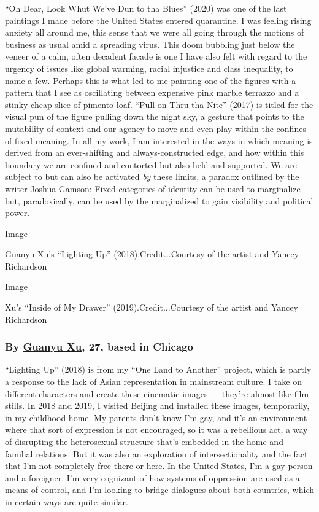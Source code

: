 ``Oh Dear, Look Whut We've Dun to tha Blues'' (2020) was one of the last
paintings I made before the United States entered quarantine. I was
feeling rising anxiety all around me, this sense that we were all going
through the motions of business as usual amid a spreading virus. This
doom bubbling just below the veneer of a calm, often decadent facade is
one I have also felt with regard to the urgency of issues like global
warming, racial injustice and class inequality, to name a few. Perhaps
this is what led to me painting one of the figures with a pattern that I
see as oscillating between expensive pink marble terrazzo and a stinky
cheap slice of pimento loaf. ``Pull on Thru tha Nite'' (2017) is titled
for the visual pun of the figure pulling down the night sky, a gesture
that points to the mutability of context and our agency to move and even
play within the confines of fixed meaning. In all my work, I am
interested in the ways in which meaning is derived from an ever-shifting
and always-constructed edge, and how within this boundary we are
confined and contorted but also held and supported. We are subject to
but can also be activated \emph{by} these limits, a paradox outlined by
the writer \href{http://www.joshuagamson.com/}{Joshua Gamson}: Fixed
categories of identity can be used to marginalize but, paradoxically,
can be used by the marginalized to gain visibility and political power.

Image

Guanyu Xu's ``Lighting Up'' (2018).Credit...Courtesy of the artist and
Yancey Richardson

Image

Xu's ``Inside of My Drawer'' (2019).Credit...Courtesy of the artist and
Yancey Richardson

\hypertarget{by-guanyu-xu-27-based-in-chicago}{%
\subsubsection{\texorpdfstring{\textbf{By}
\textbf{\href{https://www.xuguanyu.com/}{Guanyu Xu}, 27, based in
Chicago}}{By Guanyu Xu, 27, based in Chicago}}\label{by-guanyu-xu-27-based-in-chicago}}

``Lighting Up'' (2018) is from my ``One Land to Another'' project, which
is partly a response to the lack of Asian representation in mainstream
culture. I take on different characters and create these cinematic
images --- they're almost like film stills. In 2018 and 2019, I visited
Beijing and installed these images, temporarily, in my childhood home.
My parents don't know I'm gay, and it's an environment where that sort
of expression is not encouraged, so it was a rebellious act, a way of
disrupting the heterosexual structure that's embedded in the home and
familial relations. But it was also an exploration of intersectionality
and the fact that I'm not completely free there or here. In the United
States, I'm a gay person and a foreigner. I'm very cognizant of how
systems of oppression are used as a means of control, and I'm looking to
bridge dialogues about both countries, which in certain ways are quite
similar.

